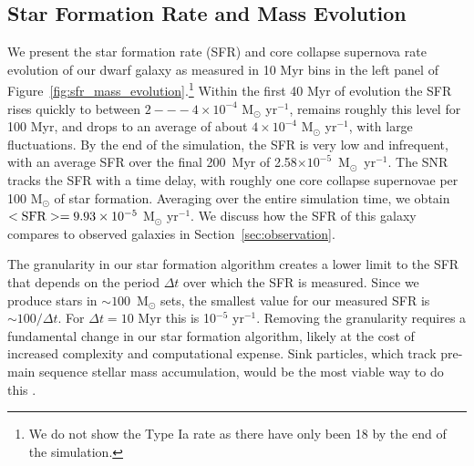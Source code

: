 \documentclass[twocolumn]{aastex61}
\begin{document}
\subsection{Star Formation Rate and Mass Evolution}
\label{sec:sfr}

We present the star formation rate (SFR) and core collapse supernova rate evolution of our dwarf galaxy as measured in 10 Myr bins in the left panel of Figure~\ref{fig:sfr_mass_evolution}.\footnote{We do not show the Type Ia rate as there have only been 18 by the end of the simulation.} Within the first 40 Myr of evolution the SFR rises quickly to between $2---4 \times 10^{-4}$ M$_{\odot}$ yr$^{-1}$, remains roughly this level for 100 Myr, and drops to an average of about $4 \times 10^{-4}$ M$_{\odot}$ yr$^{-1}$, with large fluctuations. By the end of the simulation, the SFR is very low and infrequent, with an average SFR over the final 200~Myr of 2.58$\times 10^{-5}$~M$_{\odot}$~yr$^{-1}$. The SNR tracks the SFR with a time delay, with roughly one core collapse supernovae per 100 M$_{\odot}$ of star formation. Averaging over the entire simulation time, we obtain  $<\rm{SFR}> = 9.93 \times 10^{-5}$ M$_{\odot}$ yr$^{-1}$. We discuss how the SFR of this galaxy compares to observed galaxies in Section~\ref{sec:observation}.

The granularity in our star formation algorithm creates a lower limit to the SFR that depends on the period $\Delta t$ over which the SFR is measured. Since we produce stars in $\sim 100$~M$_{\odot}$ sets, the smallest value for our measured SFR is $\sim 100/ \Delta t$. For $\Delta t = 10$ Myr this is 10$^{-5}$ yr$^{-1}$. Removing the granularity requires a fundamental change in our star formation algorithm, likely at the cost of increased complexity and computational expense. Sink particles, which track pre-main sequence stellar mass accumulation, would be the most viable way to do this \citep[see for example ][]{Krumholz2004,Federrath2010,GongOstriker2013,BleulerTeyssier2014,Sormani2017}.
\end{document}
